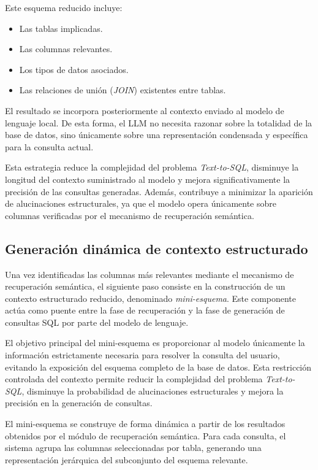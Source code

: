 Este esquema reducido incluye:

\begin{itemize}
\item Las tablas implicadas.
\item Las columnas relevantes.
\item Los tipos de datos asociados.
\item Las relaciones de unión (\textit{JOIN}) existentes entre tablas.
\end{itemize}

El resultado se incorpora posteriormente al contexto enviado al modelo de lenguaje local. De esta forma, el LLM no necesita razonar sobre la totalidad de la base de datos, sino únicamente sobre una representación condensada y específica para la consulta actual.

Esta estrategia reduce la complejidad del problema \textit{Text-to-SQL}, disminuye la longitud del contexto suministrado al modelo y mejora significativamente la precisión de las consultas generadas. Además, contribuye a minimizar la aparición de alucinaciones estructurales, ya que el modelo opera únicamente sobre columnas verificadas por el mecanismo de recuperación semántica.

\subsection{Generación dinámica de contexto estructurado}
Una vez identificadas las columnas más relevantes mediante el mecanismo de recuperación semántica, el siguiente paso consiste en la construcción de un contexto estructurado reducido, denominado \textit{mini-esquema}. Este componente actúa como puente entre la fase de recuperación y la fase de generación de consultas SQL por parte del modelo de lenguaje.

El objetivo principal del mini-esquema es proporcionar al modelo únicamente la información estrictamente necesaria para resolver la consulta del usuario, evitando la exposición del esquema completo de la base de datos. Esta restricción controlada del contexto permite reducir la complejidad del problema \textit{Text-to-SQL}, disminuye la probabilidad de alucinaciones estructurales y mejora la precisión en la generación de consultas.

El mini-esquema se construye de forma dinámica a partir de los resultados obtenidos por el módulo de recuperación semántica. Para cada consulta, el sistema agrupa las columnas seleccionadas por tabla, generando una representación jerárquica del subconjunto del esquema relevante.

